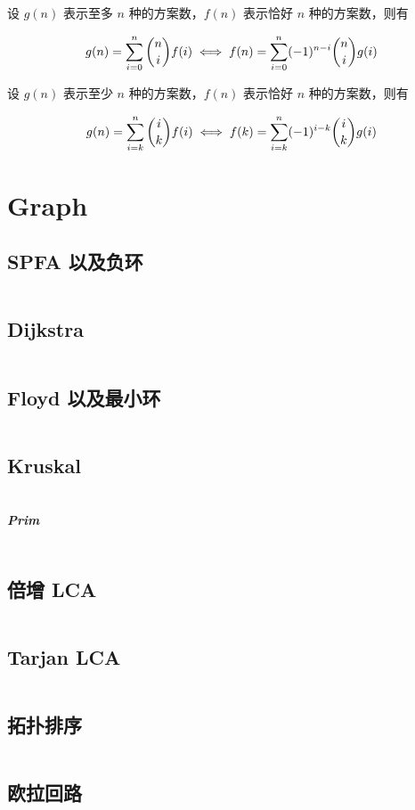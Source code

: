 \documentclass[titlepage, a4paper]{article}
\begin{document}
\begin{multicols}{2}
\begin{spacing}{0.6}
			 		设 $g(n)$ 表示至多 $n$ 种的方案数，$f(n)$ 表示恰好 $n$ 种的方案数，则有
			 		
			 		$$
			 		g(n) =  \sum\limits_{i = 0}^n \dbinom{n}{i} f(i) \iff f(n) = \sum\limits_{i = 0}^n (-1)^{n - i}\dbinom{n}{i}g(i)
			 		$$ 
			 		
			 		设 $g(n)$ 表示至少 $n$ 种的方案数，$f(n)$ 表示恰好 $n$ 种的方案数，则有
			 		
			 		$$
			 		g(n) = \sum\limits_{i = k}^n\dbinom{i}{k}f(i) \iff f(k) = \sum\limits_{i = k}^n (-1)^{i - k}\dbinom{i}{k} g(i)
			 		$$
			 	
			 \section{Graph}
			 	\subsection{SPFA 以及负环}
			 		\inputminted{cpp}{src/Graph/Spfa.cpp}
			 	\subsection{Dijkstra}
			 		\inputminted{cpp}{src/Graph/Dijkstra.cpp}
			 	\subsection{Floyd 以及最小环}
			 		\inputminted{cpp}{src/Graph/Floyd.cpp}
			 	\subsection{Kruskal}
			 		\inputminted{cpp}{src/Graph/Kruskal.cpp}
			 	\subparagraph{Prim}
			 		\inputminted{cpp}{src/Graph/Prim.cpp}
			 	\subsection{倍增 LCA}
			 		\inputminted{cpp}{src/Graph/Multiper_lca.cpp}
			 	\subsection{Tarjan LCA}
			 		\inputminted{cpp}{src/Graph/Tarjan_Lca.cpp}
			 	\subsection{拓扑排序}
			 		\inputminted{cpp}{src/Graph/Topo_sort.cpp}
			 	\subsection{欧拉回路}
			 		\inputminted{cpp}{src/Graph/Euler_path.cpp}

\end{spacing}
\end{multicols}
\end{document}
